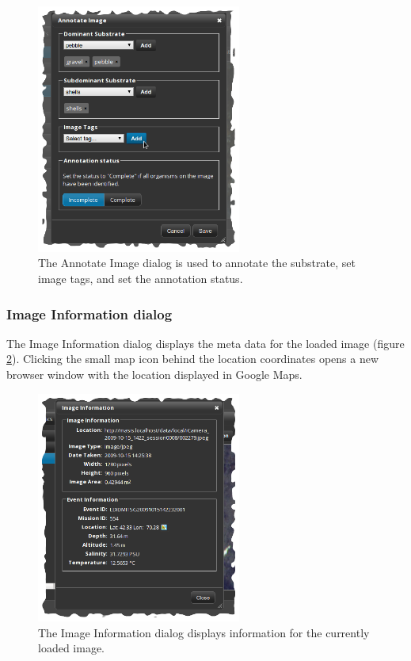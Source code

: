 \documentclass[twoside,a4paper]{refart}
\begin{document}
\begin{figure}[hbtp]
\centering
\includegraphics[width=0.6\textwidth]{screenshots/masis-annotate-image}
\caption{The Annotate Image dialog is used to annotate the substrate, set image tags, and set the annotation status.}
\label{fig:masis-annotate-image}
\end{figure}

\subsubsection{Image Information dialog}
\label{Image Information dialog}

The Image Information dialog displays the meta data for the loaded image (figure \ref{fig:masis-image-info}). Clicking the small map icon behind the location coordinates opens a new browser window with the location displayed in Google Maps.

\begin{figure}[hbtp]
\centering
\includegraphics[width=0.6\textwidth]{screenshots/masis-image-info}
\caption{The Image Information dialog displays information for the currently loaded image.}
\label{fig:masis-image-info}
\end{figure}
\end{document}
